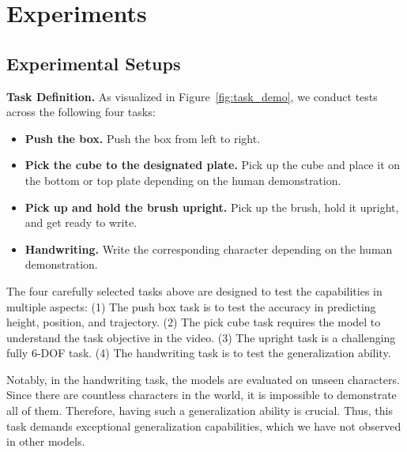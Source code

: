 \section{Experiments}
\label{sec:experiments}

\subsection{Experimental Setups}
\noindent\textbf{Task Definition.}
As visualized in Figure~\ref{fig:task_demo}, we conduct tests across the following four tasks:
\begin{itemize}
    \item \textbf{Push the box. }Push the box from left to right.
    \item \textbf{Pick the cube to the designated plate. }Pick up the cube and place it on the bottom or top plate depending on the human demonstration.
    \item \textbf{Pick up and hold the brush upright. }Pick up the brush, hold it upright, and get ready to write.
    \item \textbf{Handwriting. }Write the corresponding character depending on the human demonstration.
\end{itemize}
The four carefully selected tasks above are designed to test the capabilities in multiple aspects: (1) The push box task is to test the accuracy in predicting height, position, and trajectory. (2) The pick cube task requires the model to understand the task objective in the video. (3) The upright task is a challenging fully 6-DOF task. (4) The handwriting task is to test the generalization ability. 

Notably, in the handwriting task, the models are evaluated on unseen characters. Since there are countless characters in the world, it is impossible to demonstrate all of them. Therefore, having such a generalization ability is crucial. Thus, this task demands exceptional generalization capabilities, which we have not observed in other models. 

